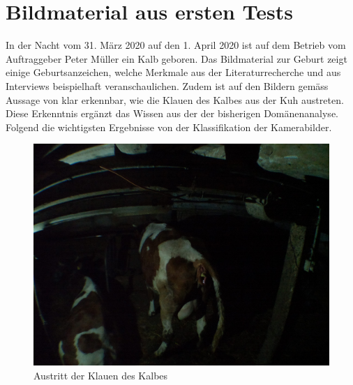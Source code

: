 
\section{Bildmaterial aus ersten Tests}

In der Nacht vom 31. März 2020 auf den 1. April 2020 ist auf dem Betrieb vom Auftraggeber Peter Müller ein Kalb geboren. Das Bildmaterial zur Geburt zeigt einige Geburtsanzeichen, welche Merkmale aus der Literaturrecherche und aus Interviews beispielhaft veranschaulichen. Zudem ist auf den Bildern gemäss Aussage von \citep{Muller2020a} klar erkennbar, wie die Klauen des Kalbes aus der Kuh austreten. Diese Erkenntnis ergänzt das Wissen aus der der bisherigen Domänenanalyse. Folgend die wichtigsten Ergebnisse von der Klassifikation der Kamerabilder. \\





\begin{figure}[h]
	\center
	\includegraphics[scale=0.075]{Grafiken/austrittklauen.jpg}
	\caption{Austritt der Klauen des Kalbes \citep{Muller2020a}} 
	\label{fig: Austritt der Klauen des Kalbes}
\end{figure}


